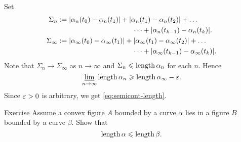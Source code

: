 Set 
\begin{align*}\Sigma_n
&\df
|\alpha_n(t_0)-\alpha_n(t_1)|+|\alpha_n(t_1)-\alpha_n(t_2)|+\dots
\\
&\ \ \ \ \ \ \ \ \ \ \ \ \ \ \ \ \ \ \ \ \ \ \ \ \ \ \ \ \ \ \ \ \dots+|\alpha_n(t_{k-1})-\alpha_n(t_k)|.
\\
\Sigma_\infty
&\df
|\alpha_\infty(t_0)-\alpha_\infty(t_1)|+|\alpha_\infty(t_1)-\alpha_\infty(t_2)|+\dots
\\
&\ \ \ \ \ \ \ \ \ \ \ \ \ \ \ \ \ \ \ \ \ \ \ \ \ \ \ \ \ \ \ \ \dots+|\alpha_\infty(t_{k-1})-\alpha_\infty(t_k)|.
\end{align*}
Note that $\Sigma_n\to \Sigma_\infty$ as $n\to\infty$
and $\Sigma_n\leqslant\mathop{\rm length}\nolimits\alpha_n$ for each $n$.
Hence
$$\varliminf_{n\to\infty} \mathop{\rm length}\nolimits\alpha_n \geqslant \mathop{\rm length}\nolimits\alpha_\infty-\varepsilon.$$
Since $\varepsilon>0$ is arbitrary, we get \ref{eq:semicont-length}.\qeds


\begin{thm}{Exercise}
Assume a convex figure $A$ bounded by a curve $\alpha$ lies in a figure $B$ bounded by a curve $\beta$.
Show that 
\[\mathop{\rm length}\nolimits\alpha\leqslant \mathop{\rm length}\nolimits\beta.\]
\end{thm}


